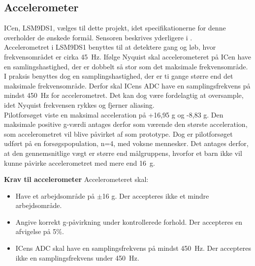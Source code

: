 \subsection{Accelerometer}\label{krav:acc}
ICen, LSM9DS1, vælges til dette projekt, idet specifikationerne for denne overholder de ønskede formål. Sensoren beskrives yderligere i . \\
Accelerometret i LSM9DS1 benyttes til at detektere gang og løb, hvor frekvensområdet er cirka 45~Hz. Ifølge Nyquist skal accelerometeret på ICen have en samlingshastighed, der er dobbelt så stor som det maksimale frekvensområde. I praksis benyttes dog en samplingshastighed, der er ti gange større end det maksimale frekvensområde. Derfor skal ICens ADC have en samplingsfrekvens på mindst 450~Hz for accelerometret. Det kan dog være fordelagtig at oversample, idet Nyquist frekvensen rykkes og fjerner aliasing. \citep{Webster2011} \\
Pilotforsøget viste en maksimal acceleration på +16,95 g og -8,83 g. Den maksimale positive g-værdi antages derfor som værende den største acceleration, som accelerometret vil blive påvirket af som prototype. Dog er pilotforsøget udført på en forsøgspopulation, n=4, med voksne mennesker. Det antages derfor, at den gennemsnitlige vægt er større end målgruppens, hvorfor et barn ikke vil kunne påvirke accelerometret med mere end 16~g.

\textbf{Krav til accelerometer} \newline 
Accelerometeret skal:
\begin{itemize}
\item Have et arbejdsområde på $\pm$16 g. Der accepteres ikke et mindre arbejdsområde.
\item Angive korrekt g-påvirkning under kontrollerede forhold. Der accepteres en afvigelse på 5\%.
\item ICens ADC skal have en samplingsfrekvens på mindst 450~Hz. Der accepteres ikke en samplingsfrekvens under 450~Hz.
\end{itemize}

